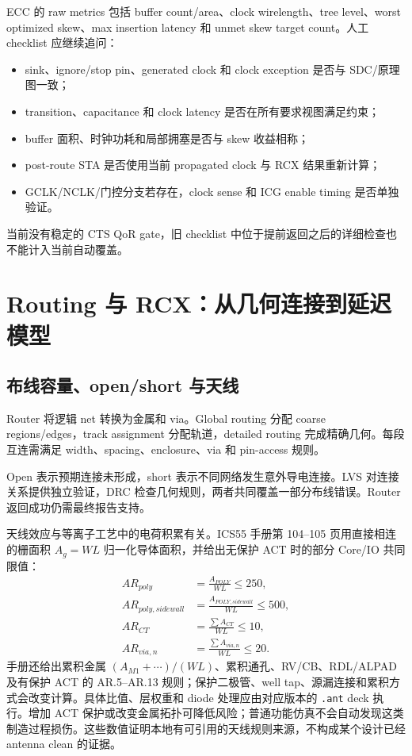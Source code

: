 \documentclass[UTF8,a4paper,11pt,fontset=fandol]{ctexart}
\numberwithin{equation}{section}
\newcommand{\code}[1]{\nolinkurl{#1}}
\newcommand{\checkbox}{$\square$}
\begin{document}
ECC 的 raw metrics 包括 buffer count/area、clock wirelength、tree level、worst optimized skew、max insertion latency 和 unmet skew target count。人工 checklist 应继续追问：
\begin{itemize}
  \item[\checkbox] sink、ignore/stop pin、generated clock 和 clock exception 是否与 SDC/原理图一致；
  \item[\checkbox] transition、capacitance 和 clock latency 是否在所有要求视图满足约束；
  \item[\checkbox] buffer 面积、时钟功耗和局部拥塞是否与 skew 收益相称；
  \item[\checkbox] post-route STA 是否使用当前 propagated clock 与 RCX 结果重新计算；
  \item[\checkbox] GCLK/NCLK/门控分支若存在，clock sense 和 ICG enable timing 是否单独验证。
\end{itemize}
当前没有稳定的 CTS QoR gate，旧 checklist 中位于提前返回之后的详细检查也不能计入当前自动覆盖。

\section{Routing 与 RCX：从几何连接到延迟模型}

\subsection{布线容量、open/short 与天线}

Router 将逻辑 net 转换为金属和 via。Global routing 分配 coarse regions/edges，track assignment 分配轨道，detailed routing 完成精确几何。每段互连需满足 width、spacing、enclosure、via 和 pin-access 规则。

Open 表示预期连接未形成，short 表示不同网络发生意外导电连接。LVS 对连接关系提供独立验证，DRC 检查几何规则，两者共同覆盖一部分布线错误。Router 返回成功仍需最终报告支持。

天线效应与等离子工艺中的电荷积累有关。ICS55 手册第 104--105 页用直接相连的栅面积 $A_g=WL$ 归一化导体面积，并给出无保护 ACT 时的部分 Core/IO 共同限值\cite{pdkrules}：
\begin{align}
AR_{poly}&=\frac{A_{POLY}}{WL}\le250,\\
AR_{poly,sidewall}&=\frac{A_{POLY,sidewall}}{WL}\le500,\\
AR_{CT}&=\frac{\sum A_{CT}}{WL}\le10,\\
AR_{via,n}&=\frac{\sum A_{via,n}}{WL}\le20.
\end{align}
手册还给出累积金属 $(A_{M1}+\cdots)/(WL)$、累积通孔、RV/CB、RDL/ALPAD 及有保护 ACT 的 AR.5--AR.13 规则；保护二极管、well tap、源漏连接和累积方式会改变计算。具体比值、层权重和 diode 处理应由对应版本的 \code{.ant} deck 执行。增加 ACT 保护或改变金属拓扑可降低风险；普通功能仿真不会自动发现这类制造过程损伤\cite{enics,pdkrules}。这些数值证明本地有可引用的天线规则来源，不构成某个设计已经 antenna clean 的证据。
\end{document}
